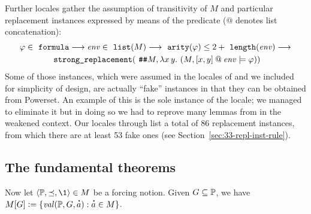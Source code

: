 Further locales gather the assumption of transitivity of $M$ and
particular replacement instances expressed by means of the
 predicate ($@$ denotes
list concatenation):
\begin{multline}\label{eq:replacement_assm_def}
\varphi \in \formula  \limp \mathit{env} \in \isatt{list}(M) \limp \isatt{arity}(\varphi) \leq 2+ \isatt{length}(\mathit{env}) \limp \\
 \isatt{strong{\uscore}replacement}(\isatt{\#\#} M, \lambda x\, y.\ (M, [x,y]
\mathbin{@} \mathit{env}  \models \varphi))
\end{multline}
Some of those instances, which were assumed in the locales of
 and we included for simplicity of design,
are actually “fake” instances in that they can be obtained from
Powerset. An example of this is the sole instance of the
 locale; we managed to eliminate it but in
doing so we had to reprove many lemmas from
 in the weakened context. Our locales
 through  list a total of 86
replacement instances, from which there are at least 53 fake ones (see
Section~\ref{sec:33-repl-inst-rule}).

\subsection{The fundamental theorems}
Now let $\lb \PP, {\preceq} ,\1\rb \in M$ be a forcing notion. Given $G\subseteq \mathbb{P}$, we have
$M[G]\defi \{ \val(\PP,G,\punto{a}) : \punto{a}\in M \}$.

